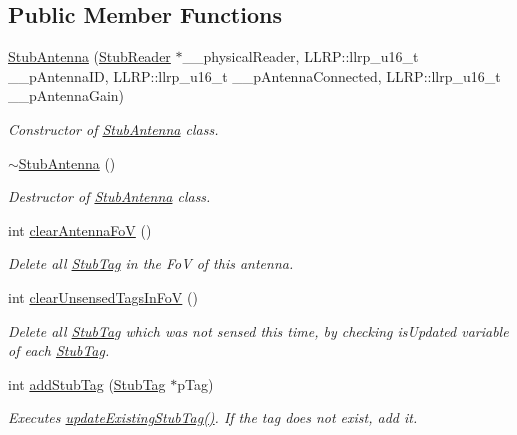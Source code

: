 \subsection*{Public Member Functions}
\begin{DoxyCompactItemize}
\item 
\hyperlink{class_e_l_f_i_n_1_1_stub_antenna_aa2986eed573874538fb54c6cb37ef697}{Stub\-Antenna} (\hyperlink{class_e_l_f_i_n_1_1_stub_reader}{Stub\-Reader} $\ast$\-\_\-\-\_\-physical\-Reader, L\-L\-R\-P\-::llrp\-\_\-u16\-\_\-t \-\_\-\-\_\-p\-Antenna\-I\-D, L\-L\-R\-P\-::llrp\-\_\-u16\-\_\-t \-\_\-\-\_\-p\-Antenna\-Connected, L\-L\-R\-P\-::llrp\-\_\-u16\-\_\-t \-\_\-\-\_\-p\-Antenna\-Gain)
\begin{DoxyCompactList}\small\item\em Constructor of \hyperlink{class_e_l_f_i_n_1_1_stub_antenna}{Stub\-Antenna} class. \end{DoxyCompactList}\item 
\hyperlink{class_e_l_f_i_n_1_1_stub_antenna_adc9c57be01ee7f073e97296f24df4e86}{$\sim$\-Stub\-Antenna} ()
\begin{DoxyCompactList}\small\item\em Destructor of \hyperlink{class_e_l_f_i_n_1_1_stub_antenna}{Stub\-Antenna} class. \end{DoxyCompactList}\item 
int \hyperlink{class_e_l_f_i_n_1_1_stub_antenna_ab483ec3c888bdde7cdf747a2cf35065b}{clear\-Antenna\-Fo\-V} ()
\begin{DoxyCompactList}\small\item\em Delete all \hyperlink{class_e_l_f_i_n_1_1_stub_tag}{Stub\-Tag} in the Fo\-V of this antenna. \end{DoxyCompactList}\item 
int \hyperlink{class_e_l_f_i_n_1_1_stub_antenna_a3ebdc1c12e14a0342be3a5128cc2ece0}{clear\-Unsensed\-Tags\-In\-Fo\-V} ()
\begin{DoxyCompactList}\small\item\em Delete all \hyperlink{class_e_l_f_i_n_1_1_stub_tag}{Stub\-Tag} which was not sensed this time, by checking is\-Updated variable of each \hyperlink{class_e_l_f_i_n_1_1_stub_tag}{Stub\-Tag}. \end{DoxyCompactList}\item 
int \hyperlink{class_e_l_f_i_n_1_1_stub_antenna_ab9f5d4a6aca345118a00fddf88248e37}{add\-Stub\-Tag} (\hyperlink{class_e_l_f_i_n_1_1_stub_tag}{Stub\-Tag} $\ast$p\-Tag)
\begin{DoxyCompactList}\small\item\em Executes \hyperlink{class_e_l_f_i_n_1_1_stub_antenna_aa42fa66b71bfa1c8224b79cded75b9d9}{update\-Existing\-Stub\-Tag()}. If the tag does not exist, add it. \end{DoxyCompactList}\item 

\end{DoxyCompactItemize}
